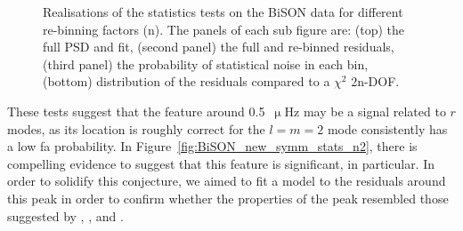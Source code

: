 \begin{figure}[!ht]
	\qquad
	
	\caption{Realisations of the statistics tests on the BiSON data for different re-binning factors (n). The panels of each sub figure are: (top) the full PSD and fit, (second panel) the full and re-binned residuals, (third panel) the probability of statistical noise in each bin, (bottom) distribution of the residuals compared to a $\chi^2$ 2n-DOF.}
	\label{fig:BiSON_new_symm_stats}
\end{figure}


These tests suggest that the feature around 0.5~$\upmu$Hz may be a signal related to $r$ modes, as its location is roughly correct for the $l=m=2$ mode consistently has a low \gls{fa} probability. %
In Figure~\ref{fig:BiSON_new_symm_stats_n2}, there is compelling evidence to suggest that this feature is significant, in particular. In order to solidify this conjecture, we aimed to fit a model to the residuals around this peak in order to confirm whether the properties of the peak resembled those suggested by \citet{loptien_global-scale_2018}, \citet{liang_time-distance_2019}, and \citet{lanza_sectoral_2019}.


